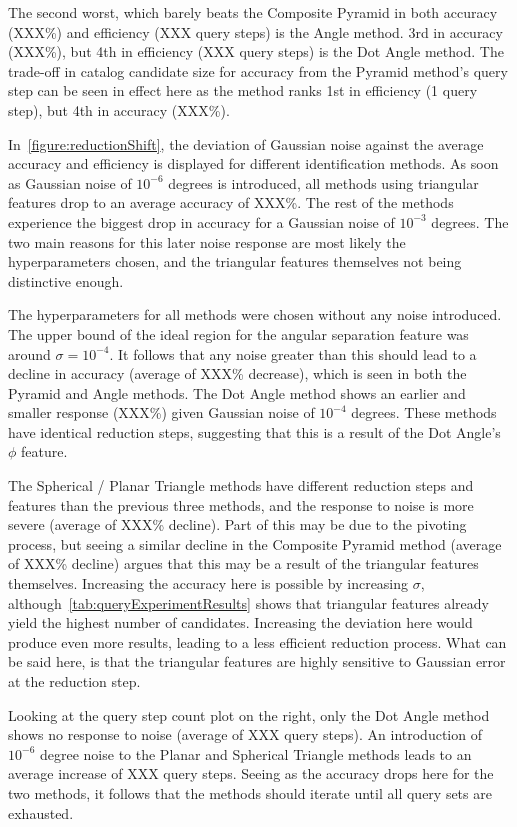 The second worst, which barely beats the Composite Pyramid in both accuracy (XXX\%) and efficiency (XXX query steps) is
the Angle method.
3rd in accuracy (XXX\%), but 4th in efficiency (XXX query steps) is the Dot Angle method.
The trade-off in catalog candidate size for accuracy from the Pyramid method's query step can be seen in effect here as
the method ranks 1st in efficiency (1 query step), but 4th in accuracy (XXX\%).

In~\autoref{figure:reductionShift}, the deviation of Gaussian noise against the average accuracy and efficiency is
displayed for different identification methods.
As soon as Gaussian noise of $10^{-6}$ degrees is introduced, all methods using triangular features drop to an average
accuracy of XXX\%.
The rest of the methods experience the biggest drop in accuracy for a Gaussian noise of $10^{-3}$ degrees.
The two main reasons for this later noise response are most likely the hyperparameters chosen, and the triangular
features themselves not being distinctive enough.

The hyperparameters for all methods were chosen without any noise introduced.
The upper bound of the ideal region for the angular separation feature was around $\sigma = 10^{-4}$.
It follows that any noise greater than this should lead to a decline in accuracy (average of XXX\% decrease), which
is seen in both the Pyramid and Angle methods.
The Dot Angle method shows an earlier and smaller response (XXX\%) given Gaussian noise of $10^{-4}$ degrees.
These methods have identical reduction steps, suggesting that this is a result of the Dot Angle's $\phi$ feature.

The Spherical / Planar Triangle methods have different reduction steps and features than the previous three methods,
and the response to noise is more severe (average of XXX\% decline).
Part of this may be due to the pivoting process, but seeing a similar decline in the Composite Pyramid method
(average of XXX\% decline) argues that this may be a result of the triangular features themselves.
Increasing the accuracy here is possible by increasing $\sigma$, although~\autoref{tab:queryExperimentResults} shows
that triangular features already yield the highest number of candidates.
Increasing the deviation here would produce even more results, leading to a less efficient reduction process.
What can be said here, is that the triangular features are highly sensitive to Gaussian error at the reduction step.

Looking at the query step count plot on the right, only the Dot Angle method shows no response to noise
(average of XXX query steps).
An introduction of $10^{-6}$ degree noise to the Planar and Spherical Triangle methods leads to an average increase of
XXX query steps.
Seeing as the accuracy drops here for the two methods, it follows that the methods should iterate until all
query sets are exhausted.

